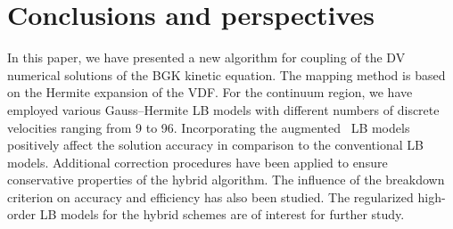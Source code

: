 \documentclass{elsarticle} %
\begin{document}
\begin{comment}%

\begin{figure}
    \centering
    \texttt{[image: \_pois\_hybr\_kn01\_cropped]}
    \caption{
        The normalized longitudinal velocity in the linear force-driven Poiseuille flow between parallel plates for $k=0.1$.
        The position of the coupling interface are shown by the vertical dashed lines.
    }\label{fig:poiseuille}
\end{figure}

In addition, the linear Poiseuille-flow problem is solved numerically.
The hybrid solution is compared with the DV and LB ones in Fig.~\ref{fig:poiseuille},
where the D2Q9-regularized LB model is employed~\cite{Latt2006, Mont2015}.
The hybrid solution based on the D2Q9-regularized model is very close to the DV results,
while the D2Q9-regularized model is failed to capture the Knudsen-layer part of the solution.
It is clearly seen from Fig.~\ref{fig:poiseuille} that the application of the regularized LB models in the hybrid scheme
can positively affect the solution accuracy in comparison to the conventional LB models.

\end{comment}

\section{Conclusions and perspectives}\label{sec:summary}

In this paper, we have presented a new algorithm for coupling of the DV numerical solutions of the BGK kinetic equation.
The mapping method is based on the Hermite expansion of the VDF.
For the continuum region, we have employed various Gauss--Hermite LB models
with different numbers of discrete velocities ranging from 9 to 96.
Incorporating the augmented~\cite{Feuchter2016} LB models %
positively affect the solution accuracy in comparison to the conventional LB models.
Additional correction procedures have been applied to ensure conservative properties of the hybrid algorithm.
The influence of the breakdown criterion on accuracy and efficiency has also been studied.
The regularized high-order LB models for the hybrid schemes are of interest for further study.
\end{document}
